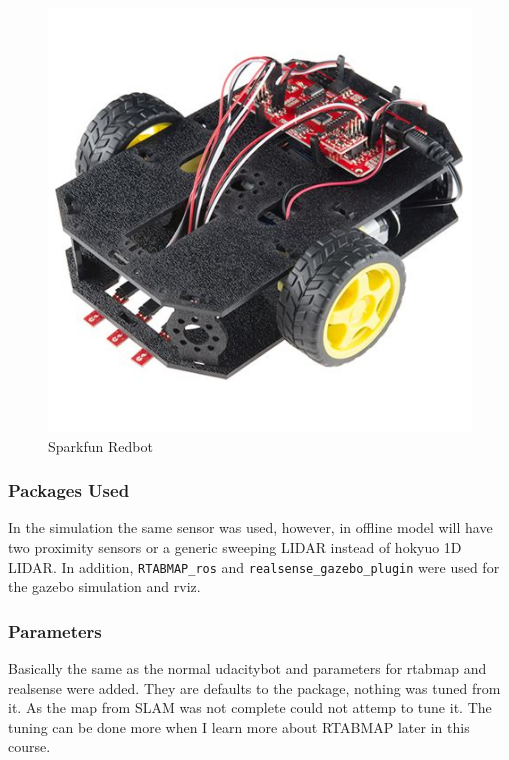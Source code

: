 \documentclass[10pt,journal,compsoc]{IEEEtran}
\begin{document}
\begin{figure}[thpb]
      \centering
      \includegraphics[width=\linewidth]{./img/sparkfunredbot.jpeg}
      \caption{Sparkfun Redbot}
      \label{fig:sparkfunredbot}
\end{figure}
\subsubsection{Packages Used}
In the simulation the same sensor was used, however, in offline model will have two proximity sensors or a generic sweeping LIDAR instead of hokyuo 1D LIDAR.
In addition, \verb!RTABMAP_ros! and \verb!realsense_gazebo_plugin! were used for the gazebo simulation and rviz.
\subsubsection{Parameters}
Basically the same as the normal udacitybot and parameters for rtabmap and realsense were added. They are defaults to the package, nothing was tuned from it. 
As the map from SLAM was not complete could not attemp to tune it. The tuning can be done more when I learn more about RTABMAP later in this course.
\end{document}
